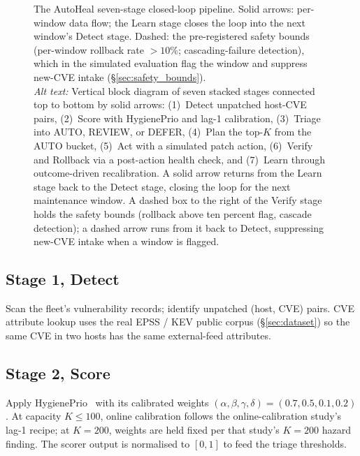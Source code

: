 \begin{figure}[!t]
 \caption{The AutoHeal seven-stage closed-loop pipeline. Solid
 arrows: per-window data flow; the Learn stage closes the loop into
 the next window's Detect stage. Dashed: the pre-registered safety
 bounds (per-window rollback rate ${>}10\%$; cascading-failure
 detection), which in the simulated evaluation flag the window and
 suppress new-CVE intake (\S\ref{sec:safety_bounds}).\\[2pt]
 \textit{Alt text:} Vertical block diagram of seven stacked stages
 connected top to bottom by solid arrows: (1)~Detect unpatched
 host-CVE pairs, (2)~Score with HygienePrio and lag-1 calibration,
 (3)~Triage into AUTO, REVIEW, or DEFER, (4)~Plan the top-$K$ from the
 AUTO bucket, (5)~Act with a simulated patch action, (6)~Verify and
 Rollback via a post-action health check, and (7)~Learn through
 outcome-driven recalibration. A solid arrow returns from the Learn
 stage back to the Detect stage, closing the loop for the next
 maintenance window. A dashed box to the right of the Verify stage
 holds the safety bounds (rollback above ten percent flag, cascade
 detection); a dashed arrow runs from it back to Detect, suppressing
 new-CVE intake when a window is flagged.}
 \label{fig:architecture}
\end{figure}

\subsection{Stage 1, Detect}

Scan the fleet's vulnerability records; identify unpatched
(host, CVE) pairs. CVE attribute lookup uses the real EPSS / KEV
public corpus (\S\ref{sec:dataset}) so the same CVE in two hosts
has the same external-feed attributes.

\subsection{Stage 2, Score}

Apply HygienePrio~\cite{paper4hygieneprio} with its calibrated
weights $(\alpha, \beta, \gamma, \delta) = (0.7, 0.5, 0.1,
0.2)$. At capacity $K \leq 100$, online calibration follows
the online-calibration study's lag-1 recipe; at $K = 200$, weights
are held fixed per that study's $K = 200$ hazard finding. The scorer
output is normalised to $[0, 1]$ to feed the triage thresholds.

